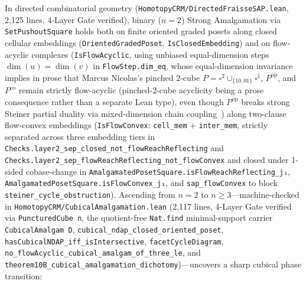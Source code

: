 \documentclass[10pt,twoside,openright]{book}
\theoremstyle{crmplain}
\theoremstyle{crmdef}
\theoremstyle{crmremark}
\begin{document}
In directed combinatorial geometry (\texttt{HomotopyCRM/\allowbreak Directed\allowbreak Fraisse\allowbreak SAP.lean}, 2,125 lines, 4-Layer Gate verified), binary ($n = 2$) Strong Amalgamation via \texttt{Set\allowbreak Pushout\allowbreak Square} holds both on finite oriented graded posets along closed cellular embeddings (\texttt{Oriented\allowbreak Graded\allowbreak Poset}, \texttt{Is\allowbreak Closed\allowbreak Embedding}) and on flow-acyclic complexes (\texttt{IsFlow\allowbreak Acyclic}, using unbiased equal-dimension steps $\dim(u) = \dim(v)$ in \texttt{FlowStep.\allowbreak dim\_\allowbreak eq}, whose equal-dimension invariance implies in prose that Marcus Nicolas's pinched $2$-cube $P = \square^2 \cup_{\{10, 01\}} \square^1$, $P^{\mathrm{op}}$, and $P^{\mathrm{co}}$ remain strictly flow-acyclic (pinched-$2$-cube acyclicity being a prose consequence rather than a separate Lean type), even though $P^{\mathrm{op}}$ breaks strong Steiner partial duality via mixed-dimension chain coupling~\cite{Masuda26}) along two-clause flow-convex embeddings (\texttt{IsFlow\allowbreak Convex}: \texttt{cell\_\allowbreak mem} + \texttt{inter\_\allowbreak mem}, strictly separated across three embedding tiers in \texttt{Checks.\allowbreak layer2\_\allowbreak sep\_\allowbreak closed\_\allowbreak not\_\allowbreak flow\allowbreak Reach\allowbreak Reflecting} and \texttt{Checks.\allowbreak layer2\_\allowbreak sep\_\allowbreak flow\allowbreak Reach\allowbreak Reflecting\_\allowbreak not\_\allowbreak flow\allowbreak Convex} and closed under 1-sided cobase-change in \texttt{Amalgamated\allowbreak Poset\allowbreak Square.\allowbreak isFlow\allowbreak Reach\allowbreak Reflecting\_\allowbreak j₁}, \texttt{Amalgamated\allowbreak Poset\allowbreak Square.\allowbreak isFlow\allowbreak Convex\_\allowbreak j₁}, and \texttt{sap\_\allowbreak flow\allowbreak Convex} to block \texttt{steiner\_\allowbreak cycle\_\allowbreak obstruction}). Ascending from $n = 2$ to $n \ge 3$---machine-checked in \texttt{HomotopyCRM/\allowbreak Cubical\allowbreak Amalgamation.lean} (2,117 lines, 4-Layer Gate verified via \texttt{Punctured\allowbreak Cube n}, the quotient-free \texttt{Nat.find} minimal-support carrier \texttt{Cubical\allowbreak Amalgam D}, \texttt{cubical\_\allowbreak ndap\_\allowbreak closed\_\allowbreak oriented\_\allowbreak poset}, \texttt{hasCubical\allowbreak NDAP\_\allowbreak iff\_\allowbreak isIntersective}, \texttt{facet\allowbreak Cycle\allowbreak Diagram}, \texttt{no\_\allowbreak flow\allowbreak Acyclic\_\allowbreak cubical\_\allowbreak amalgam\_\allowbreak of\_\allowbreak three\_\allowbreak le}, and \texttt{theorem10B\_\allowbreak cubical\_\allowbreak amalgamation\_\allowbreak dichotomy})---uncovers a sharp cubical phase transition:
\end{document}
